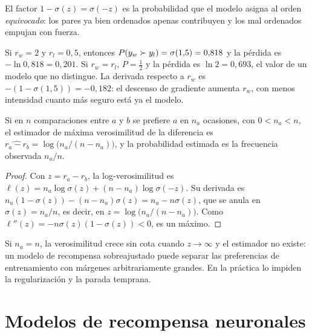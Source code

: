 El factor $1-\sigma(z)=\sigma(-z)$ es la probabilidad que el modelo asigna al orden \emph{equivocado}: los pares ya bien ordenados apenas contribuyen y los mal ordenados empujan con fuerza.

\begin{ejemplo}\label{ej:bt}
Si $r_w=2$ y $r_l=0{,}5$, entonces $P(y_w\succ y_l)=\sigma(1{,}5)=0{,}818$ y la pérdida es $-\ln 0{,}818=0{,}201$. Si $r_w=r_l$, $P=\tfrac12$ y la pérdida es $\ln 2=0{,}693$, el valor de un modelo que no distingue. La derivada respecto a $r_w$ es $-(1-\sigma(1{,}5))=-0{,}182$: el descenso de gradiente aumenta $r_w$, con menos intensidad cuanto más seguro está ya el modelo.
\end{ejemplo}

\begin{proposicion}\label{prop:bt-dos}
Si en $n$ comparaciones entre $a$ y $b$ se prefiere $a$ en $n_a$ ocasiones, con $0<n_a<n$, el estimador de máxima verosimilitud de la diferencia es $\widehat{r_a-r_b}=\log\bigl(n_a/(n-n_a)\bigr)$, y la probabilidad estimada es la frecuencia observada $n_a/n$.
\end{proposicion}

\begin{proof}
Con $z=r_a-r_b$, la log-verosimilitud es $\ell(z)=n_a\log\sigma(z)+(n-n_a)\log\sigma(-z)$. Su derivada es $n_a(1-\sigma(z))-(n-n_a)\sigma(z)=n_a-n\sigma(z)$, que se anula en $\sigma(z)=n_a/n$, es decir, en $z=\log\bigl(n_a/(n-n_a)\bigr)$. Como $\ell''(z)=-n\sigma(z)(1-\sigma(z))<0$, es un máximo.
\end{proof}

Si $n_a=n$, la verosimilitud crece sin cota cuando $z\to\infty$ y el estimador no existe: un modelo de recompensa sobreajustado puede separar las preferencias de entrenamiento con márgenes arbitrariamente grandes. En la práctica lo impiden la regularización y la parada temprana.

\section{Modelos de recompensa neuronales}

